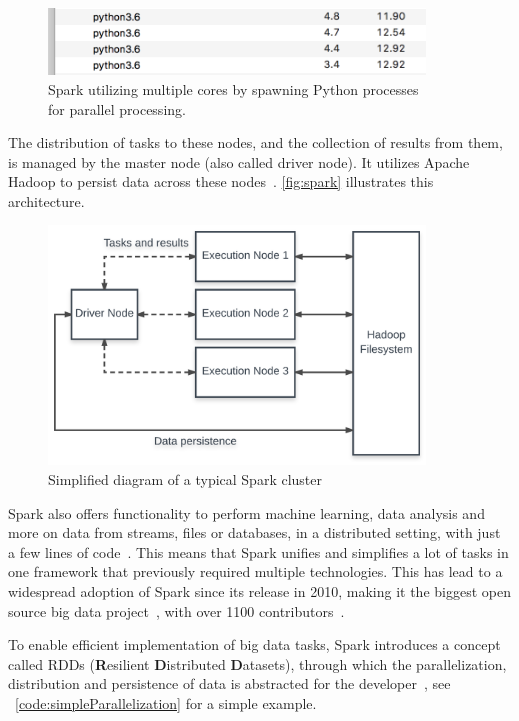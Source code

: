 \begin{figure}
    \centering
    \caption{Spark utilizing multiple cores by spawning Python processes \\for parallel processing.}
    \label{fig:spark_processes}
    \includegraphics[width=10cm]{../images/python_processes.png}
\end{figure}

The distribution of tasks to these nodes, and the collection of results from them,
is managed by the master node (also called driver node).
It utilizes Apache Hadoop to persist data across these nodes~\cite{Zaharia2016}.
\autoref{fig:spark} illustrates this architecture.

\begin{figure}
    \centering
    \caption{Simplified diagram of a typical Spark cluster}
    \label{fig:spark}
    \includegraphics[width=10cm]{../figures/spark.pdf}
\end{figure}

\par
Spark also offers functionality to perform machine learning, data analysis and more on data from streams,
files or databases, in a distributed setting, with just a few lines of code~\cite{sparkDocs}.
This means that Spark unifies and simplifies a lot of tasks in one framework that previously required multiple technologies.
This has lead to a widespread adoption of Spark since its release in 2010,
making it the biggest open source big data project~\cite{Zaharia2016}, with over 1100 contributors~\cite{sparkContributor}.

\par
To enable efficient implementation of big data tasks, Spark introduces a concept called RDDs
(\textbf{R}esilient \textbf{D}istributed \textbf{D}atasets),
through which the parallelization, distribution and persistence of data is abstracted for the developer~\cite{sparkDocs},
see ~\autoref{code:simpleParallelization} for a simple example.

